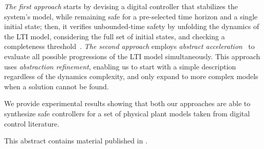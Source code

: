 \documentclass[submission]{eptcs}
\begin{document}
\emph{The first approach} starts by devising a
digital controller that stabilizes the system's model, while remaining safe for a
pre-selected time horizon and a single initial state; then, it verifies
unbounded-time safety by unfolding the dynamics of the LTI model, considering the
full set of initial states, and checking a completeness
threshold~\cite{DBLP:conf/vmcai/KroeningS03}.%
%
\emph{The second approach}
employs \emph{abstract acceleration}~\cite{cattaruzza2015unbounded} to
evaluate all possible progressions of the LTI model simultaneously. 
This approach uses \emph{abstraction refinement},
enabling us to start with a simple description regardless of the
dynamics complexity, and only expand to more complex models
when a solution cannot be found.

We provide experimental results showing that both our approaches are able to
synthesize safe controllers for a set of physical
plant models taken from digital control literature.

This abstract contains material published in \cite{DBLP:conf/kbse/AbateBCCCDKKP17,DBLP:conf/cav/AbateBCCDKKP17}.

       
  
\end{document}
